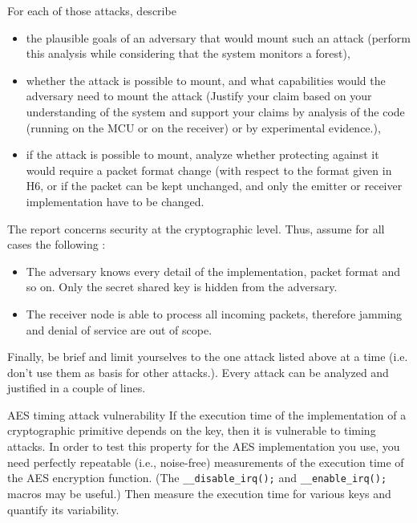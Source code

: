 \noindent For each of those attacks, describe
\begin{itemize}
    \item the plausible goals of an adversary that would mount such an attack
        (perform this analysis while considering that the system monitors a
        forest),
    \item whether the attack is possible to mount, and what capabilities would the
        adversary need to mount the attack (Justify your claim based on your
        understanding of the system and support your claims by analysis of the
        code (running on the MCU or on the receiver) or by experimental
        evidence.),
    \item if the attack is possible to mount, analyze whether protecting
        against it would require a packet format change (with respect to the format
        given in H6,
        or if the packet can be kept unchanged, and only the emitter or
        receiver implementation have to be changed.
\end{itemize}
\noindent The report concerns security at the cryptographic level. Thus, assume for all cases the following :
\begin{itemize}
\item The adversary knows every detail of the implementation, packet format and so on. Only the secret shared key is hidden from the adversary.
\item The receiver node is able to process all incoming packets, therefore jamming and denial of service are out of scope.
\end{itemize}
Finally, be brief and limit yourselves to the one attack listed above at a time (i.e. don't use them as basis for other attacks.). Every attack can be analyzed and justified in a couple of lines.

\begin{bclogo}[couleur = gray!20, arrondi = 0.2, logo=\bcinfo]{AES timing attack vulnerability}
    If the execution time of the implementation of a cryptographic primitive
    depends on the key, then it is vulnerable to timing attacks.
    In order to test this property for the AES implementation you use, you need
    perfectly repeatable (i.e., noise-free) measurements of the execution time
    of the AES encryption function. (The \texttt{\_\_disable\_irq();} and
    \texttt{\_\_enable\_irq();} macros may be useful.)
    Then measure the execution time for various keys and quantify its variability.
\end{bclogo}
